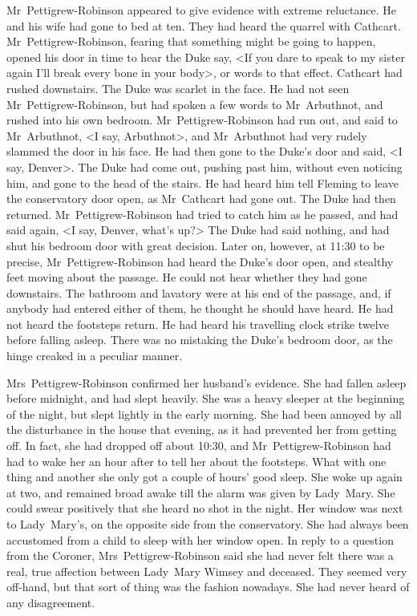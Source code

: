 Mr~Pettigrew-Robinson appeared to give evidence with extreme reluctance. He and his wife had gone to bed at ten. They had heard the quarrel with Cathcart. Mr~Pettigrew-Robinson, fearing that something might be going to happen, opened his door in time to hear the Duke say, <If you dare to speak to my sister again I'll break every bone in your body>, or words to that effect. Cathcart had rushed downstairs. The Duke was scarlet in the face. He had not seen Mr~Pettigrew-Robinson, but had spoken a few words to Mr~Arbuthnot, and rushed into his own bedroom. Mr~Pettigrew-Robinson had run out, and said to Mr~Arbuthnot, <I say, Arbuthnot>, and Mr~Arbuthnot had very rudely slammed the door in his face. He had then gone to the Duke's door and said, <I say, Denver>. The Duke had come out, pushing past him, without even noticing him, and gone to the head of the stairs. He had heard him tell Fleming to leave the conservatory door open, as Mr~Cathcart had gone out. The Duke had then returned. Mr~Pettigrew-Robinson had tried to catch him as he passed, and had said again, <I say, Denver, what's up?> The Duke had said nothing, and had shut his bedroom door with great decision. Later on, however, at 11:30 to be precise, Mr~Pettigrew-Robinson had heard the Duke's door open, and stealthy feet moving about the passage. He could not hear whether they had gone downstairs. The bathroom and lavatory were at his end of the passage, and, if anybody had entered either of them, he thought he should have heard. He had not heard the footsteps return. He had heard his travelling clock strike twelve before falling asleep. There was no mistaking the Duke's bedroom door, as the hinge creaked in a peculiar manner.

Mrs~Pettigrew-Robinson confirmed her husband's evidence. She had fallen asleep before midnight, and had slept heavily. She was a heavy sleeper at the beginning of the night, but slept lightly in the early morning. She had been annoyed by all the disturbance in the house that evening, as it had prevented her from getting off. In fact, she had dropped off about 10:30, and Mr~Pettigrew-Robinson had had to wake her an hour after to tell her about the footsteps. What with one thing and another she only got a couple of hours' good sleep. She woke up again at two, and remained broad awake till the alarm was given by Lady~Mary. She could swear positively that she heard no shot in the night. Her window was next to Lady~Mary's, on the opposite side from the conservatory. She had always been accustomed from a child to sleep with her window open. In reply to a question from the Coroner, Mrs~Pettigrew-Robinson said she had never felt there was a real, true affection between Lady~Mary Wimsey and deceased. They seemed very off-hand, but that sort of thing was the fashion nowadays. She had never heard of any disagreement.

